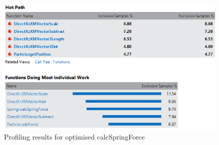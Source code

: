 \begin{landscape}
    \begin{figure}[!htb]
    \begin{center}
      \includegraphics[scale=1.0]{Figures/calcspringforce_profiling_after}
    \end{center}
    \caption{Profiling results for optimised calcSpringForce}
    \label{fig:profiling4}
  \end{figure}
\end{landscape}